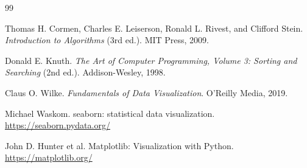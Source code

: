\newpage
{}
\begin{thebibliography}{99}

Thomas H. Cormen, Charles E. Leiserson, Ronald L. Rivest, and Clifford Stein.
\newblock \textit{Introduction to Algorithms} (3rd ed.).
\newblock MIT Press, 2009.

Donald E. Knuth.
\newblock \textit{The Art of Computer Programming, Volume 3: Sorting and Searching} (2nd ed.).
\newblock Addison-Wesley, 1998.

Claus O. Wilke.
\newblock \textit{Fundamentals of Data Visualization}.
\newblock O'Reilly Media, 2019.

Michael Waskom.
\newblock seaborn: statistical data visualization.
\newblock \url{https://seaborn.pydata.org/}

John D. Hunter et al.
\newblock Matplotlib: Visualization with Python.
\newblock \url{https://matplotlib.org/}

\end{thebibliography}
